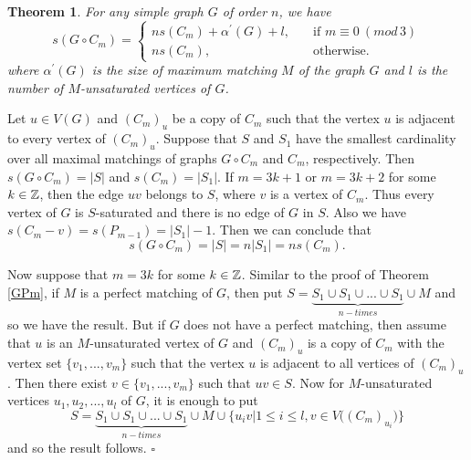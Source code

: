 \documentclass[11pt]{article}
\newtheorem{theorem}{Theorem}[section]
\newcommand{\proof}{\noindent{\bf Proof.\ }}
\newcommand{\qed}{\hfill $\square$\medskip}
\begin{document}
\begin{theorem}\label{GCm}
For any simple graph  $G$ of order $n$, we have
$$s(G\circ {C_m})=\left\{
\begin{array}{lcl}
ns(C_m)+\alpha^{\prime}(G)+l, & \quad\mbox{if  $m\equiv 0 ~ (mod\, 3)$}\\[15pt]
ns(C_m), & \quad\mbox{otherwise.}
\end{array}
\right.$$ where $\alpha^{\prime}(G)$ is the size of maximum matching $M$ of the graph $G$ and $l$ is the number of 
$M$-unsaturated vertices of $G$.
\end{theorem}

\proof
Let $u\in V(G)$ and $(C_m)_u$ be a copy of $C_m$ such that the vertex $u$ is adjacent to every vertex of $(C_m)_u$. 
Suppose that $S$ and $S_1$ have the smallest cardinality over all maximal matchings of graphs $G\circ C_m$ and 
$C_m$, respectively. Then $s(G\circ C_m)=|S|$ and $s(C_m)=|S_1|$. 
If $m=3k+1$ or $m=3k+2$ for some $k\in \Bbb{Z}$, then the edge $uv$ belongs to $S$, where $v$ is a vertex of $C_m$. Thus every vertex of $G$ is $S$-saturated and there is no edge of $G$ in $S$. Also we have 
$s(C_m-v)=s(P_{m-1})=|S_1|-1$. Then we can conclude that $$s(G\circ {C_m})=|S|=n|S_1|=ns(C_m).$$ 

Now suppose that $m=3k$ for some $k\in \Bbb{Z}$. Similar to the proof of Theorem \ref{GPm}, if $M$ is a perfect matching of $G$, then put $S=\underbrace{S_1\cup S_1\cup ...\cup S_1}_{n-times}\cup M$ and so we have the result. But if $G$ does not have a perfect matching, then assume that $u$ is an $M$-unsaturated vertex of $G$ and ${(C_m)}_u$ is a copy of $C_m$ with the vertex set $\{v_1, ..., v_m\}$ such that the vertex $u$ is adjacent to all vertices of ${(C_m)}_u$. Then there exist $v\in \{v_1, ..., v_m\}$ such that $uv\in S$. Now for $M$-unsaturated vertices $u_1, u_2, ..., u_l$ of $G$, it is enough to put $$S=\underbrace{S_1\cup S_1\cup ...\cup S_1}_{n-times}\cup M\cup \big\{u_iv| 1\leq i\leq l,  v\in V\big({(C_m)}_{u_i}\big)\big\}$$ and so the result follows.
\qed 

\end{document}
